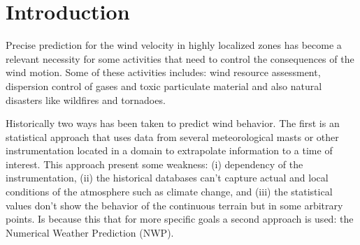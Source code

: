 \section{Introduction}
Precise prediction for the wind velocity in highly localized zones has become a relevant necessity for some  activities that need to control the consequences of the wind motion. Some of these activities includes: wind resource assessment,  dispersion control of gases and toxic particulate material and also natural disasters like wildfires and tornadoes.

Historically two ways has been taken to predict wind behavior. The first is an statistical approach that uses data from several meteorological masts or other instrumentation located in a domain to extrapolate information to a time of interest. This approach present some weakness: (i) dependency of the instrumentation, (ii) the historical databases can't capture actual and local conditions of the atmosphere such as climate change, and (iii) the statistical values don't show the behavior of the continuous terrain but in some arbitrary points. Is because this that for more specific goals a second approach is used: the Numerical Weather Prediction (NWP).

